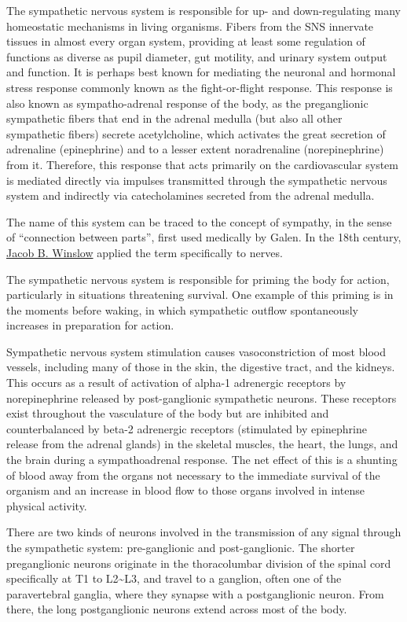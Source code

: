 The sympathetic nervous system is responsible for up- and down-regulating many homeostatic mechanisms in living organisms. Fibers from the SNS innervate tissues in almost every organ system, providing at least some regulation of functions as diverse as pupil diameter, gut motility, and urinary system output and function. It is perhaps best known for mediating the neuronal and hormonal stress response commonly known as the fight-or-flight response. This response is also known as sympatho-adrenal response of the body, as the preganglionic sympathetic fibers that end in the adrenal medulla (but also all other sympathetic fibers) secrete acetylcholine, which activates the great secretion of adrenaline (epinephrine) and to a lesser extent noradrenaline (norepinephrine) from it. Therefore, this response that acts primarily on the cardiovascular system is mediated directly via impulses transmitted through the sympathetic nervous system and indirectly via catecholamines secreted from the adrenal medulla.

The name of this system can be traced to the concept of sympathy, in the sense of ``connection between parts'', first used medically by Galen. In the 18th century, \href{https://en.wikipedia.org/wiki/Jacob_B._Winslow}{Jacob B. Winslow} applied the term specifically to nerves.

The sympathetic nervous system is responsible for priming the body for action, particularly in situations threatening survival. One example of this priming is in the moments before waking, in which sympathetic outflow spontaneously increases in preparation for action.

Sympathetic nervous system stimulation causes vasoconstriction of most blood vessels, including many of those in the skin, the digestive tract, and the kidneys. This occurs as a result of activation of alpha-1 adrenergic receptors by norepinephrine released by post-ganglionic sympathetic neurons. These receptors exist throughout the vasculature of the body but are inhibited and counterbalanced by beta-2 adrenergic receptors (stimulated by epinephrine release from the adrenal glands) in the skeletal muscles, the heart, the lungs, and the brain during a sympathoadrenal response. The net effect of this is a shunting of blood away from the organs not necessary to the immediate survival of the organism and an increase in blood flow to those organs involved in intense physical activity.

There are two kinds of neurons involved in the transmission of any signal through the sympathetic system: pre-ganglionic and post-ganglionic. The shorter preganglionic neurons originate in the thoracolumbar division of the spinal cord specifically at T1 to L2\textasciitilde L3, and travel to a ganglion, often one of the paravertebral ganglia, where they synapse with a postganglionic neuron. From there, the long postganglionic neurons extend across most of the body.

